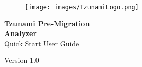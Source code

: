 \pagestyle{empty}
\begin{figure}[tp] %
\texttt{[image: images/TzunamiLogo.png]}
\end{figure}
\begin{flushright}  
	\vspace*{\fill}
	 \textcolor{coverTextColor}{\huge \textbf{Tzunami Pre-Migration}}\\
	 \textcolor{coverTextColor}{\huge \textbf{{Analyzer}\\}}  
	Quick Start User Guide
	\vspace*{\fill}
\par

\end{flushright}
\begin{center} 
{\Large\vspace*{2mm} \par\vspace*{4mm} \vspace*{3mm}\large Version 1.0}\par %
\end{center} 
 